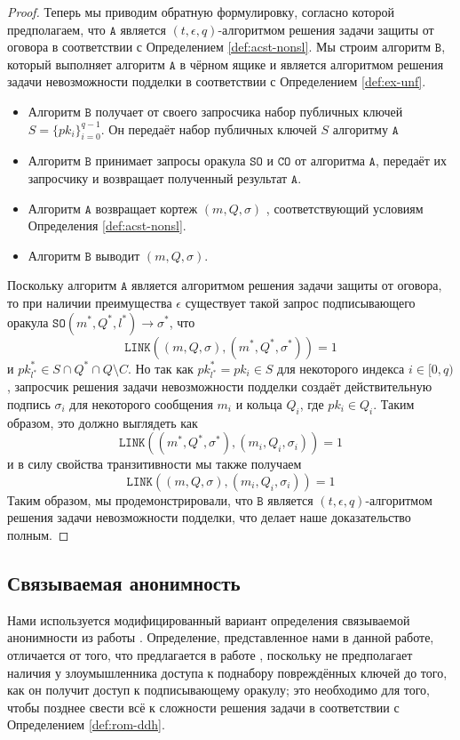 \documentclass{llncs}
\newcommand{\A}{\texttt{A}}
\newcommand{\B}{\texttt{B}}
\begin{document}
\begin{proof}
    Теперь мы приводим обратную формулировку, согласно которой предполагаем, что $\A$ является $(t,\epsilon,q)$-алгоритмом решения задачи защиты от оговора в соответствии с Определением \ref{def:acst-nonsl}. Мы строим алгоритм $\B$, который выполняет алгоритм $\A$ в чёрном ящике и является алгоритмом решения задачи невозможности подделки в соответствии с Определением \ref{def:ex-unf}.
    \begin{itemize}
        \item Алгоритм $\B$ получает от своего запросчика набор публичных ключей $S = \{pk_i\}_{i=0}^{q-1}$. Он передаёт набор публичных ключей $S$ алгоритму $\A$
        \item Алгоритм $\B$ принимает запросы оракула $\texttt{SO}$ и $\texttt{CO}$ от алгоритма $\A$, передаёт их запросчику и возвращает полученный результат $\A$.
        \item Алгоритм $\A$ возвращает кортеж $(m,Q,\sigma)$ , соответствующий условиям Определения \ref{def:acst-nonsl}.
        \item Алгоритм $\B$ выводит $(m,Q,\sigma)$.
    \end{itemize}
    Поскольку алгоритм $\A$ является алгоритмом решения задачи защиты от оговора, то при наличии преимущества $\epsilon$ существует такой запрос подписывающего оракула $\texttt{SO}(m^*,Q^*,l^*) \to \sigma^*$, что $$\texttt{LINK}((m,Q,\sigma),(m^*,Q^*,\sigma^*)) = 1$$ и $pk_{l^*}^* \in S \cap Q^* \cap Q \setminus C$. Но так как $pk_{l^*}^* = pk_i \in S$ для некоторого индекса $i \in [0,q)$, запросчик решения задачи невозможности подделки создаёт действительную подпись $\sigma_i$ для некоторого сообщения $m_i$ и кольца $Q_i$, где $pk_i \in Q_i$. Таким образом, это должно выглядеть как $$\texttt{LINK}((m^*,Q^*,\sigma^*),(m_i,Q_i,\sigma_i)) = 1$$ и в силу свойства транзитивности мы также получаем $$\texttt{LINK}((m,Q,\sigma),(m_i,Q_i,\sigma_i)) = 1$$ Таким образом, мы продемонстрировали, что $\B$ является $(t,\epsilon,q)$-алгоритмом решения задачи невозможности подделки, что делает наше доказательство полным.
\end{proof}

\subsection{Связываемая анонимность}

Нами используется модифицированный вариант определения связываемой анонимности из работы \cite{backes2019ring}. Определение, представленное нами в данной работе, отличается от  того, что предлагается в работе \cite{backes2019ring}, поскольку не предполагает наличия у злоумышленника доступа к поднабору повреждённых ключей до того, как он получит доступ к подписывающему оракулу; это необходимо для того, чтобы позднее свести всё к сложности решения задачи в соответствии с Определением \ref{def:rom-ddh}.
\end{document}

